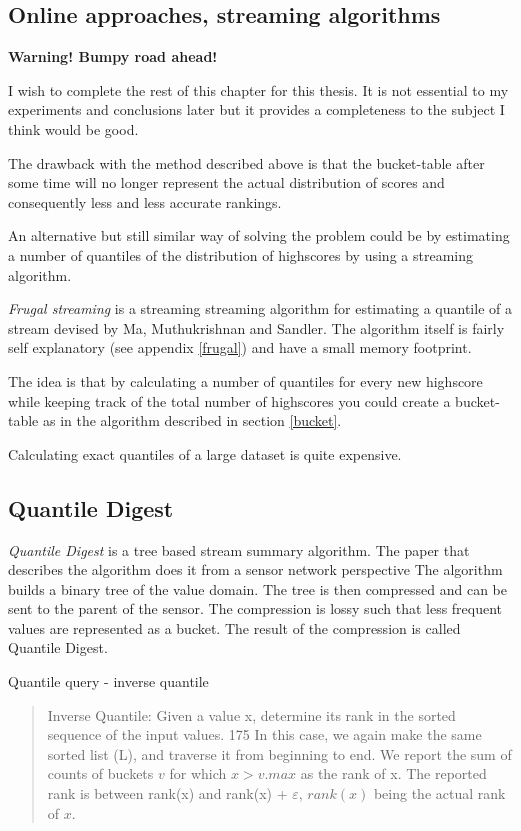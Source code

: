 \subsection{Online approaches, streaming algorithms}

\begin{mdframed}[backgroundcolor=red,innerleftmargin=15pt,leftmargin=-10pt,rightmargin=-10pt, innerrightmargin=15pt,innertopmargin=10pt,innerbottommargin=10pt, fontcolor=white, skipabove=20pt, linewidth=0]
  \textbf{Warning! Bumpy road ahead!}
  
  I wish to complete the rest of this chapter for this thesis. It is not essential to my experiments and conclusions later but it provides a completeness to the subject I think would be good.
\end{mdframed}

The drawback with the method described above is that the bucket-table after some time will no longer represent the actual distribution of scores and consequently less and less accurate rankings.

An alternative but still similar way of solving the problem could be by estimating a number of quantiles of the distribution of highscores by using a streaming algorithm. 

\emph{Frugal streaming} is a streaming streaming algorithm for estimating a quantile of a stream devised by Ma, Muthukrishnan and Sandler. \cite{frugal_streaming} The algorithm itself is fairly self explanatory (see appendix \ref{frugal}) and have a small memory footprint.

The idea is that by calculating a number of quantiles for every new highscore while keeping track of the total number of highscores you could create a bucket-table as in the algorithm described in section \ref{bucket}.

Calculating exact quantiles of a large dataset is quite expensive.

\subsection{Quantile Digest}

\emph{Quantile Digest} is a tree based stream summary algorithm. The paper that describes the algorithm does it from a sensor network perspective 
The algorithm builds a binary tree of the value domain. The tree is then compressed and can be sent to the parent of the sensor. The compression is lossy such that less frequent values are represented as a bucket. The result of the compression is called Quantile Digest.

Quantile query - inverse quantile

\blockquote{

Inverse Quantile: Given a value x, determine its
rank in the sorted sequence of the input values.
175
In this case, we again make the same sorted list (L),
and traverse it from beginning to end. We report the
sum of counts of buckets $v$ for which $x > v.max$ as
the rank of x. The reported rank is between rank(x)
and rank(x) + $\varepsilon$, $rank(x)$ being the actual rank of
$x$.}
